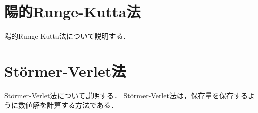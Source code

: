 \section{陽的Runge-Kutta法}
陽的Runge-Kutta法について説明する．

\section{St\"ormer-Verlet法}
St\"ormer-Verlet法について説明する．
St\"ormer-Verlet法は，保存量を保存するように数値解を計算する方法である．
